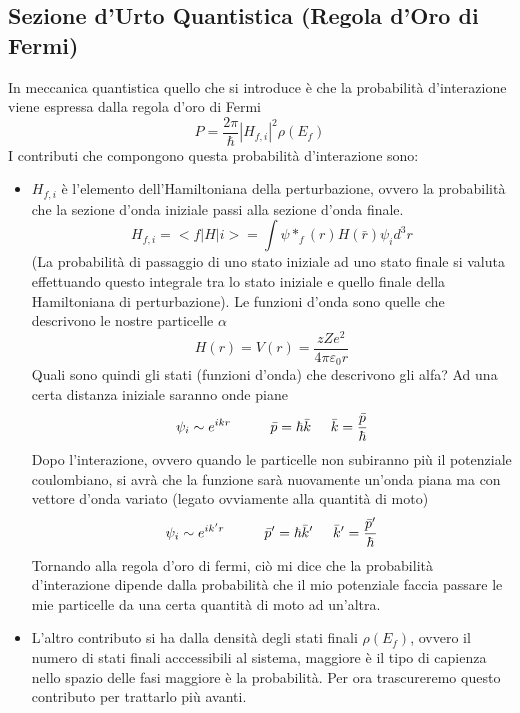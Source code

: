 \subsection{Sezione d'Urto Quantistica (Regola d'Oro di Fermi)}
In meccanica quantistica quello che si introduce è che la probabilità d'interazione viene espressa dalla regola d'oro di Fermi
\begin{equation}
P=\frac{2\pi}{\hbar}|H_{f,i}|^2\rho(E_f)
\end{equation}
I contributi che compongono questa probabilità d'interazione sono:
\begin{itemize}
\item $H_{f,i}$ è l'elemento dell'Hamiltoniana della perturbazione, ovvero la probabilità che la sezione d'onda iniziale passi alla sezione d'onda finale.
\begin{equation}
H_{f,i}=<f|H|i>=\int \psi*_f(r)H(\bar r)\psi_i d^3r
\end{equation}
(La probabilità di passaggio di uno stato iniziale ad uno stato finale si valuta effettuando questo integrale tra lo stato iniziale e quello finale della Hamiltoniana di perturbazione).
Le funzioni d'onda sono quelle che descrivono le nostre particelle $\alpha$
\begin{equation}
H(r)=V(r)=\frac{zZe^2}{4\pi \varepsilon_0r}
\end{equation}
Quali sono quindi gli stati (funzioni d'onda) che descrivono gli alfa?
Ad una certa distanza iniziale saranno onde piane
\begin{equation}
\psi_i \sim e^{ikr} \hspace{1cm}\bar p=\hbar\bar k\hspace{0.5cm}\bar k=\frac{\bar p}{\hbar}
\end{equation}
Dopo l'interazione, ovvero quando le particelle non subiranno più il potenziale coulombiano, si avrà che la funzione sarà nuovamente un'onda piana ma con vettore d'onda variato (legato ovviamente alla quantità di moto)
\begin{equation}
\psi_i \sim e^{ik'r}\hspace{1cm} \bar p'=\hbar\bar k'\hspace{0.5cm}\bar k'=\frac{\bar p'}{\hbar}
\end{equation}
Tornando alla regola d'oro di fermi, ciò mi dice che la probabilità d'interazione dipende dalla probabilità che il mio potenziale faccia passare le mie particelle da una certa quantità di moto ad un'altra.

\item L'altro contributo si ha dalla densità degli stati finali $\rho(E_f)$, ovvero il numero di stati finali acccessibili al sistema, maggiore è il tipo di capienza nello spazio delle fasi maggiore è la probabilità. Per ora trascureremo questo contributo per trattarlo più avanti.
\end{itemize}

